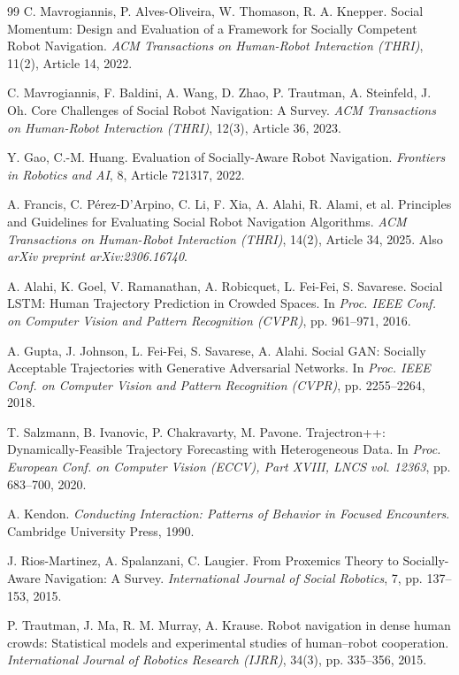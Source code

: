 \documentclass[11pt]{article}
\begin{document}
\begin{thebibliography}{99}
 C. Mavrogiannis, P. Alves-Oliveira, W. Thomason, R. A. Knepper. Social Momentum: Design and Evaluation of a Framework for Socially Competent Robot Navigation. \emph{ACM Transactions on Human-Robot Interaction (THRI)}, 11(2), Article 14, 2022.

 C. Mavrogiannis, F. Baldini, A. Wang, D. Zhao, P. Trautman, A. Steinfeld, J. Oh. Core Challenges of Social Robot Navigation: A Survey. \emph{ACM Transactions on Human-Robot Interaction (THRI)}, 12(3), Article 36, 2023.

 Y. Gao, C.-M. Huang. Evaluation of Socially-Aware Robot Navigation. \emph{Frontiers in Robotics and AI}, 8, Article 721317, 2022.

 A. Francis, C. P\'erez-D'Arpino, C. Li, F. Xia, A. Alahi, R. Alami, et al. Principles and Guidelines for Evaluating Social Robot Navigation Algorithms. \emph{ACM Transactions on Human-Robot Interaction (THRI)}, 14(2), Article 34, 2025. Also \emph{arXiv preprint arXiv:2306.16740}.

 A. Alahi, K. Goel, V. Ramanathan, A. Robicquet, L. Fei-Fei, S. Savarese. Social LSTM: Human Trajectory Prediction in Crowded Spaces. In \emph{Proc. IEEE Conf. on Computer Vision and Pattern Recognition (CVPR)}, pp. 961--971, 2016.

 A. Gupta, J. Johnson, L. Fei-Fei, S. Savarese, A. Alahi. Social GAN: Socially Acceptable Trajectories with Generative Adversarial Networks. In \emph{Proc. IEEE Conf. on Computer Vision and Pattern Recognition (CVPR)}, pp. 2255--2264, 2018.

 T. Salzmann, B. Ivanovic, P. Chakravarty, M. Pavone. Trajectron++: Dynamically-Feasible Trajectory Forecasting with Heterogeneous Data. In \emph{Proc. European Conf. on Computer Vision (ECCV), Part XVIII, LNCS vol. 12363}, pp. 683--700, 2020.

 A. Kendon. \emph{Conducting Interaction: Patterns of Behavior in Focused Encounters}. Cambridge University Press, 1990.

 J. Rios-Martinez, A. Spalanzani, C. Laugier. From Proxemics Theory to Socially-Aware Navigation: A Survey. \emph{International Journal of Social Robotics}, 7, pp. 137--153, 2015.

 P. Trautman, J. Ma, R. M. Murray, A. Krause. Robot navigation in dense human crowds: Statistical models and experimental studies of human--robot cooperation. \emph{International Journal of Robotics Research (IJRR)}, 34(3), pp. 335--356, 2015.


\end{thebibliography}
\end{document}
